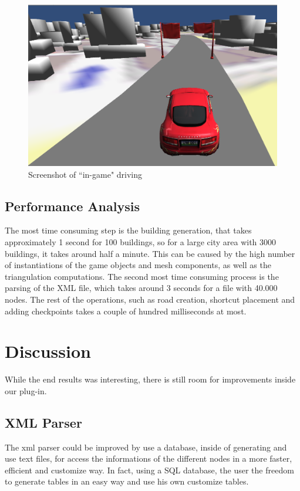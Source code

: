 \documentclass[conference]{IEEEtran}
\begin{document}
\begin{figure}[h!t]
\centering
\includegraphics[scale=0.3]{images/Car1.png}
\caption{\label{buildings} Screenshot of ``in-game" driving}
\end{figure}

\subsection{Performance Analysis}

The most time consuming step is the building generation, that takes approximately 1 second for 100 buildings, so for a large city area with 3000 buildings, it takes around half a minute. This can be caused by the high number of instantiations of the game objects and mesh components, as well as the triangulation computations. The second most time consuming process is the parsing of the XML file, which takes around 3 seconds for a file with 40.000 nodes. The rest of the operations, such as road creation, shortcut placement and adding checkpoints takes a couple of hundred milliseconds at most.

\section{Discussion}

While the end results was interesting, there is still room for improvements inside our plug-in.

\subsection{XML Parser}

The xml parser could be improved by use a database, inside of generating and use text files, for access the informations of the different nodes in a more faster, efficient and customize way. In fact, using a SQL database, the user the freedom to generate tables in an easy way and use his own customize tables.
\end{document}
